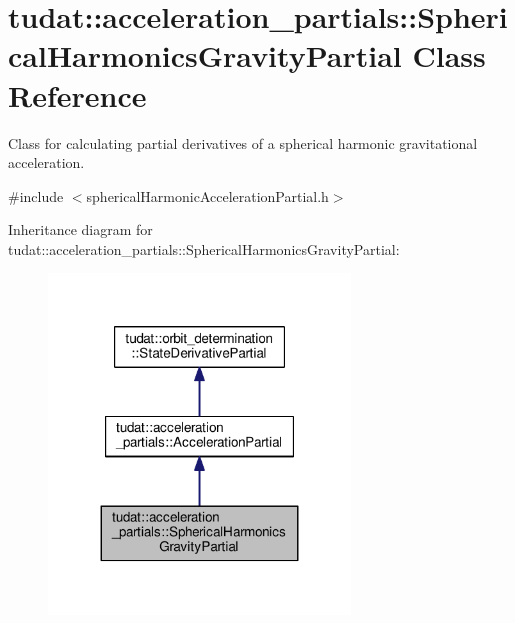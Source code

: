 \hypertarget{classtudat_1_1acceleration__partials_1_1SphericalHarmonicsGravityPartial}{}\section{tudat\+:\+:acceleration\+\_\+partials\+:\+:Spherical\+Harmonics\+Gravity\+Partial Class Reference}
\label{classtudat_1_1acceleration__partials_1_1SphericalHarmonicsGravityPartial}


Class for calculating partial derivatives of a spherical harmonic gravitational acceleration.  




{\ttfamily \#include $<$spherical\+Harmonic\+Acceleration\+Partial.\+h$>$}



Inheritance diagram for tudat\+:\+:acceleration\+\_\+partials\+:\+:Spherical\+Harmonics\+Gravity\+Partial\+:
\nopagebreak
\begin{figure}[H]
\begin{center}
\leavevmode
\includegraphics[width=227pt]{classtudat_1_1acceleration__partials_1_1SphericalHarmonicsGravityPartial__inherit__graph}
\end{center}
\end{figure}


